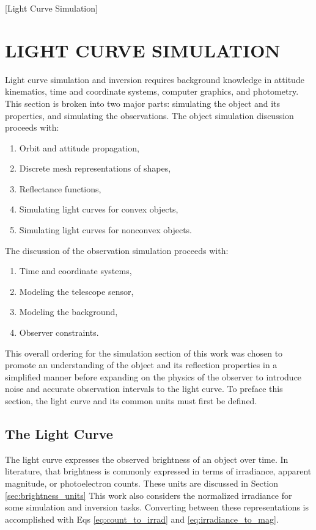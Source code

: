 [Light Curve Simulation]

\chapter{LIGHT CURVE SIMULATION}

Light curve simulation and inversion requires background knowledge in attitude kinematics, time and coordinate systems, computer graphics, and photometry. This section is broken into two major parts: simulating the object and its properties, and simulating the observations. The object simulation discussion proceeds with:

\begin{enumerate}
  \item Orbit and attitude propagation,
  \item Discrete mesh representations of shapes,
  \item Reflectance functions,
  \item Simulating light curves for convex objects,
  \item Simulating light curves for nonconvex objects.
\end{enumerate}

\noindent The discussion of the observation simulation proceeds with:

\begin{enumerate}
  \item Time and coordinate systems,
  \item Modeling the telescope sensor,
  \item Modeling the background,
  \item Observer constraints.
\end{enumerate}

This overall ordering for the simulation section of this work was chosen to promote an understanding of the object and its reflection properties in a simplified manner before expanding on the physics of the observer to introduce noise and accurate observation intervals to the light curve. To preface this section, the light curve and its common units must first be defined.

\section{The Light Curve}

The light curve expresses the observed brightness of an object over time. In literature, that brightness is commonly expressed in terms of irradiance, apparent magnitude, or photoelectron counts. These units are discussed in Section \ref{sec:brightness_units} This work also considers the normalized irradiance for some simulation and inversion tasks. Converting between these representations is accomplished with Eqs \ref{eq:count_to_irrad} and \ref{eq:irradiance_to_mag}.


